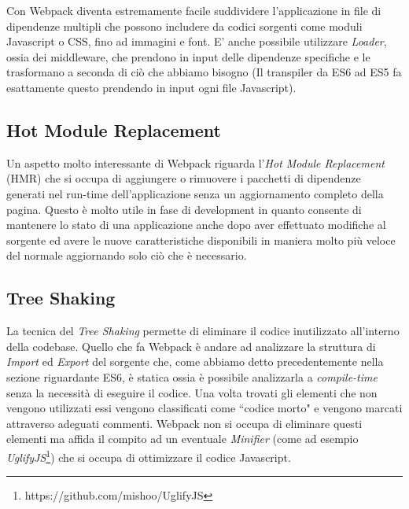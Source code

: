 \noindent
Con Webpack diventa estremamente facile suddividere l'applicazione in file di dipendenze multipli che possono includere da codici sorgenti come moduli Javascript o CSS, fino ad immagini e font.
E' anche possibile utilizzare \textit{Loader}, ossia dei middleware, che prendono in input delle dipendenze specifiche e le trasformano a seconda di ciò che abbiamo bisogno (Il transpiler da ES6 ad ES5 fa esattamente questo prendendo in input ogni file Javascript).

\subsection{Hot Module Replacement}
Un aspetto molto interessante di Webpack riguarda l'\textit{Hot Module Replacement} (HMR) che si occupa di aggiungere o rimuovere i pacchetti di dipendenze generati nel run-time dell'applicazione senza un aggiornamento completo della pagina. Questo è molto utile in fase di development in quanto consente di mantenere lo stato di una applicazione anche dopo aver effettuato modifiche al sorgente ed avere le nuove caratteristiche disponibili in maniera molto più veloce del normale aggiornando solo ciò che è necessario. 



\subsection{Tree Shaking}
La tecnica del \textit{Tree Shaking} permette di eliminare il codice inutilizzato all'interno della codebase. Quello che fa Webpack è andare ad analizzare la struttura di \textit{Import} ed \textit{Export} del sorgente che, come abbiamo detto precedentemente nella sezione riguardante ES6, è statica ossia è possibile analizzarla a \textit{compile-time} senza la necessità di eseguire il codice. Una volta trovati gli elementi che non vengono utilizzati essi vengono classificati come “codice morto" e vengono marcati attraverso adeguati commenti. Webpack non si occupa di eliminare questi elementi ma affida il compito ad un eventuale \textit{Minifier} (come ad esempio \textit{UglifyJS}\footnote{https://github.com/mishoo/UglifyJS}) che si occupa di ottimizzare il codice Javascript.


